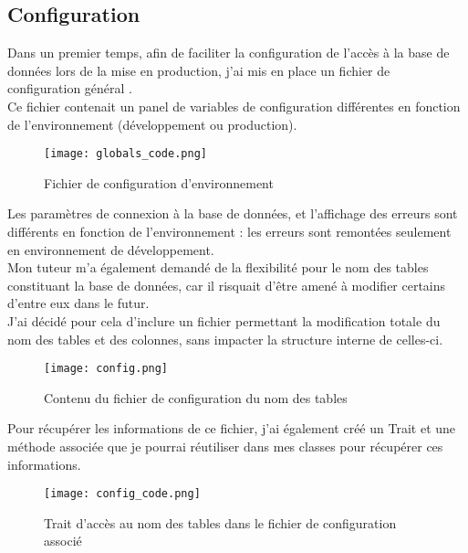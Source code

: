 \subsection{Configuration}
\vspace{1cm}

Dans un premier temps, afin de faciliter la configuration de l’accès à la base de données lors de la mise en production, j’ai mis en place un fichier de configuration général .\\
Ce fichier contenait un panel de variables de configuration différentes en fonction de l’environnement (développement ou production).

\vspace{1cm}

\begin{figure}[!h]
    \centering
    \texttt{[image: globals\_code.png]}
    \caption{Fichier de configuration d'environnement}
\end{figure}

\newpage

Les paramètres de connexion à la base de données, et l’affichage des erreurs sont différents en fonction de l’environnement : les erreurs sont remontées seulement en environnement de développement.\\ 

Mon tuteur m’a également demandé de la flexibilité pour le nom des tables constituant la base de données, car il risquait d’être amené à modifier certains d’entre eux dans le futur. \\ 

J’ai décidé pour cela d’inclure un fichier  permettant la modification totale du nom des tables et des colonnes, sans impacter la structure interne de celles-ci.

\begin{figure}[!h]
    \centering
    \texttt{[image: config.png]}
    \caption{Contenu du fichier de configuration du nom des tables}
\end{figure}

\vspace{0.5cm}

Pour récupérer les informations de ce fichier, j’ai également créé un Trait et une méthode associée que je pourrai réutiliser dans mes classes pour récupérer ces informations.

\vspace{1cm}

\begin{figure}[!h]
    \centering
    \texttt{[image: config\_code.png]}
    \caption{Trait d'accès au nom des tables dans le fichier de configuration associé}
\end{figure}

